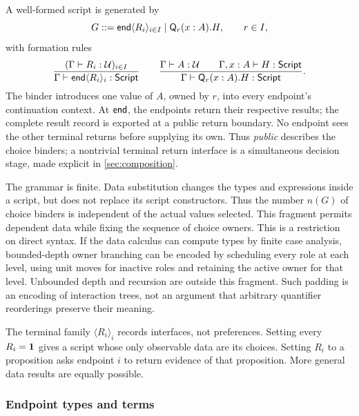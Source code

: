 \begin{definition}
A well-formed script is generated by
\begin{equation}
 G ::= \mathsf{end}\langle R_i\rangle_{i\in I}
       \mid \mathsf Q_r(x:A).H,
 \qquad r\in I,
 \label{dep:eq:2}
\end{equation}
with formation rules
\begin{equation}
 \frac{(\Gamma\vdash R_i:\mathcal U)_{i\in I}}
      {\Gamma\vdash\mathsf{end}\langle R_i\rangle_i:\mathsf{Script}}
 \qquad
 \frac{\Gamma\vdash A:\mathcal U\qquad\Gamma,x:A\vdash H:\mathsf{Script}}
      {\Gamma\vdash\mathsf Q_r(x:A).H:\mathsf{Script}}.
 \label{dep:eq:3}
\end{equation}
The binder introduces one value of $A$, owned by $r$, into every endpoint's
continuation context. At $\mathsf{end}$, the endpoints return their respective results;
the complete result record is exported at a public return boundary.
No endpoint sees the other terminal returns before supplying its own.
Thus \emph{public} describes the choice binders; a nontrivial terminal return
interface is a simultaneous decision stage, made explicit in
\cref{sec:composition}.
\end{definition}

The grammar is finite. Data substitution changes the types and expressions
inside a script, but does not replace its script constructors. Thus the number
$n(G)$ of choice binders is independent of the actual values selected. This
fragment permits dependent data while fixing the sequence of choice owners.
This is a restriction on direct syntax. If the data calculus can compute
types by finite case analysis, bounded-depth owner branching can be encoded
by scheduling every role at each level, using unit moves for inactive roles
and retaining the active owner for that level. Unbounded depth and recursion
are outside this fragment. Such padding is an encoding of interaction trees,
not an argument that arbitrary quantifier reorderings preserve their meaning.

The terminal family $\langle R_i\rangle_i$ records interfaces, not preferences.
Setting every $R_i=\mathbf 1$ gives a script whose only observable data are its
choices. Setting $R_i$ to a proposition asks endpoint $i$ to return evidence of
that proposition. More general data results are equally possible.

\subsubsection{Endpoint types and terms}

